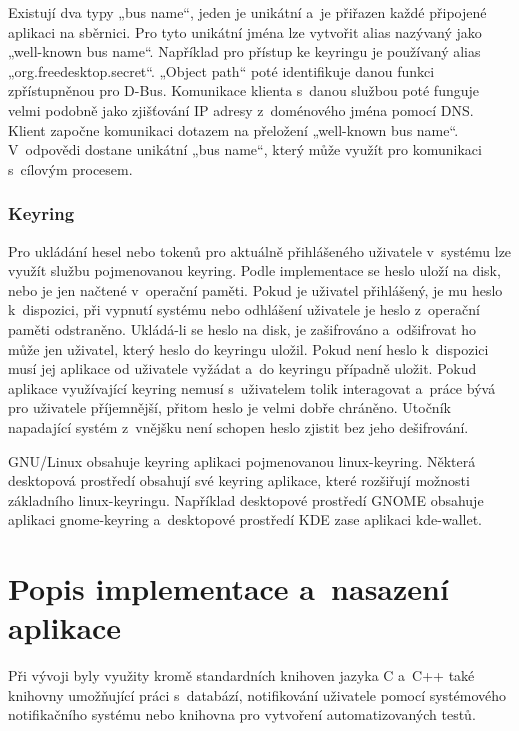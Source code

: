 Existují dva typy „bus name“, jeden je unikátní a je přiřazen každé připojené aplikaci na sběrnici. Pro tyto unikátní jména lze vytvořit alias nazývaný jako
„well-known bus name“. Například pro přístup ke keyringu je používaný alias „org.freedesktop.secret“. „Object path“ poté identifikuje danou funkci zpřístupněnou 
pro D-Bus. Komunikace klienta s danou službou poté funguje velmi podobně jako zjišťování IP adresy z doménového jména pomocí DNS. Klient započne komunikaci dotazem
na přeložení „well-known bus name“. V odpovědi dostane unikátní „bus name“, který může využít pro komunikaci s cílovým procesem. \cite{DBus}

\subsection{Keyring}

Pro ukládání hesel nebo tokenů pro aktuálně přihlášeného uživatele v systému lze využít službu pojmenovanou keyring. Podle implementace se heslo uloží na disk,
nebo je jen načtené v operační paměti. Pokud je uživatel přihlášený, je mu heslo k dispozici, při vypnutí systému nebo odhlášení uživatele je heslo z operační paměti
odstraněno. Ukládá-li se heslo na disk, je zašifrováno a odšifrovat ho může jen uživatel, který heslo do keyringu uložil. Pokud není heslo k dispozici musí jej aplikace 
od uživatele vyžádat a do keyringu případně uložit. Pokud aplikace využívající keyring nemusí s uživatelem tolik interagovat a práce bývá pro uživatele příjemnější,
přitom heslo je velmi dobře chráněno. Utočník napadající systém z vnějšku není schopen heslo zjistit bez jeho dešifrování. \cite{Keyring}

GNU/Linux obsahuje keyring aplikaci pojmenovanou linux-keyring. Některá desktopová prostředí obsahují své keyring aplikace, které rozšiřují možnosti základního linux-keyringu.
Například desktopové prostředí GNOME obsahuje aplikaci gnome-keyring a desktopové prostředí KDE zase aplikaci kde-wallet. \cite{Keyring}

\chapter{Popis implementace a nasazení aplikace}

Při vývoji byly využity kromě standardních knihoven jazyka C a C++ také knihovny umožňující práci s databází, notifikování uživatele pomocí 
systémového notifikačního systému nebo knihovna pro vytvoření automatizovaných testů.

